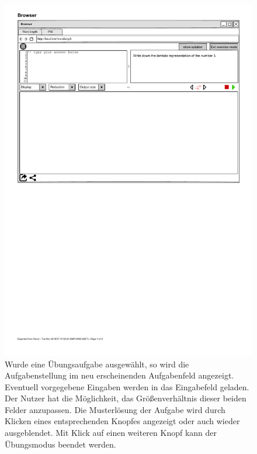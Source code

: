 \documentclass[parskip=full,11pt,twoside]{scrartcl}
\begin{document}
{\begin{figure}[H]
	\centering
	\includegraphics[width=\textwidth]{img/exerciseMode}
	\caption{\label{fig:exerciseMode}Wurde eine Übungsaufgabe ausgewählt, so wird die Aufgabenstellung im neu erscheinenden Aufgabenfeld angezeigt. Eventuell vorgegebene Eingaben werden in das Eingabefeld geladen. Der Nutzer hat die Möglichkeit, das Größenverhältnis dieser beiden Felder anzupassen. Die Musterlösung der Aufgabe wird durch Klicken eines entsprechenden Knopfes angezeigt oder auch wieder ausgeblendet. Mit Klick auf einen weiteren Knopf kann der Übungsmodus beendet werden.}
\end{figure}


}
\end{document}
